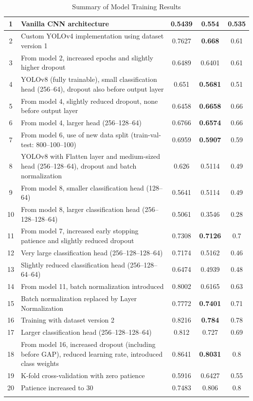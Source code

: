 \documentclass[a4paper,12pt]{article}
\begin{document}
\begin{landscape}
\begin{adjustwidth}{0cm}{-3cm}
\begin{longtable}{|c|p{12cm}|c|c|c|}
		1 & Vanilla CNN architecture & 0.5439 & \textbf{0.554} & 0.535 \\
		\hline
		2 & Custom YOLOv4 implementation using dataset version 1 & 0.7627 & \textbf{0.668} & 0.61 \\
		\hline
		3 & From model 2, increased epochs and slightly higher dropout & 0.6489 & 0.6401 & 0.61 \\
		\hline
		4 & YOLOv8 (fully trainable), small classification head (256–64), dropout also before output layer & 0.651 & \textbf{0.5681} & 0.51 \\
		\hline
		5 & From model 4, slightly reduced dropout, none before output layer & 0.6458 & \textbf{0.6658} & 0.66 \\
		\hline
		6 & From model 4, larger head (256–128–64) & 0.6766 & \textbf{0.6574} & 0.66 \\
		\hline
		7 & From model 6, use of new data split (train-val-test: 800–100–100) & 0.6959 & \textbf{0.5907} & 0.59 \\
		\hline
		8 & YOLOv8 with Flatten layer and medium-sized head (256–128–64), dropout and batch normalization & 0.626 & 0.5114 & 0.49 \\
		\hline
		9 & From model 8, smaller classification head (128–64) & 0.5641 & 0.5114 & 0.49 \\
		\hline
		10 & From model 8, larger classification head (256–128–128–64) & 0.5061 & 0.3546 & 0.28 \\
		\hline
		11 & From model 7, increased early stopping patience and slightly reduced dropout & 0.7308 & \textbf{0.7126} & 0.7 \\
		\hline
		12 & Very large classification head (256–128–128–64) & 0.7174 & 0.5162 & 0.46 \\
		\hline
		13 & Slightly reduced classification head (256–128–64–64) & 0.6474 & 0.4939 & 0.48 \\
		\hline
		14 & From model 11, batch normalization introduced & 0.8002 & 0.6165 & 0.63 \\
		\hline
		15 & Batch normalization replaced by Layer Normalization & 0.7772 & \textbf{0.7401} & 0.71 \\
		\hline
		16 & Training with dataset version 2 & 0.8216 & \textbf{0.784} & 0.78 \\
		\hline
		17 & Larger classification head (256–128–128–64) & 0.812 & 0.727 & 0.69 \\
		\hline
		18 & From model 16, increased dropout (including before GAP), reduced learning rate, introduced class weights & 0.8641 & \textbf{0.8031} & 0.8 \\
		\hline
		19 & K-fold cross-validation with zero patience & 0.5916 & 0.6427 & 0.55 \\
		\hline
		20 & Patience increased to 30 & 0.7483 & 0.806 & 0.8 \\
		\hline
		
		\caption{Summary of Model Training Results} \label{tab:model_results}
	\end{longtable}
	
	
	\end{adjustwidth}
\end{landscape}
\end{document}
